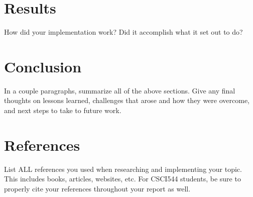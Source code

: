 \documentclass[12pt,titlepage]{article}
\begin{document}
\section{Results}

How did your implementation work? Did it accomplish what it set out to do?

\section{Conclusion}

In a couple paragraphs, summarize all of the above sections. Give any final thoughts on lessons learned, challenges that arose and how they were overcome, and next steps to take to future work.

\section{References}

List ALL references you used when researching and implementing your topic. This includes books, articles, websites, etc. For CSCI544 students, be sure to properly cite your references throughout your report as well.
\end{document}
